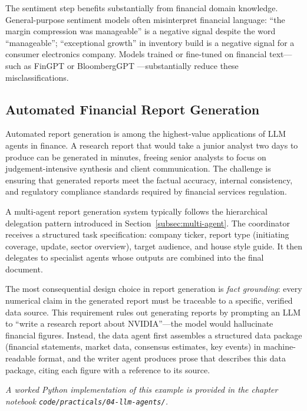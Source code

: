 \begin{context}
The sentiment step benefits substantially from financial domain knowledge. General-purpose
sentiment models often misinterpret financial language: ``the margin compression was
manageable'' is a negative signal despite the word ``manageable''; ``exceptional growth''
in inventory build is a negative signal for a consumer electronics company. Models
trained or fine-tuned on financial text---such as FinGPT \cite{Yang2023} or
BloombergGPT \cite{wu2023bloomberggpt}---substantially reduce these misclassifications.


\subsection{Automated Financial Report Generation}
\label{subsec:report-generation}

Automated report generation is among the highest-value applications of LLM agents in
finance. A research report that would take a junior analyst two days to produce can be
generated in minutes, freeing senior analysts to focus on judgement-intensive synthesis
and client communication. The challenge is ensuring that generated reports meet the
factual accuracy, internal consistency, and regulatory compliance standards required
by financial services regulation.

A multi-agent report generation system typically follows the hierarchical delegation
pattern introduced in Section~\ref{subsec:multi-agent}. The coordinator receives a
structured task specification: company ticker, report type (initiating coverage, update,
sector overview), target audience, and house style guide. It then delegates to specialist
agents whose outputs are combined into the final document.

The most consequential design choice in report generation is \emph{fact grounding}:
every numerical claim in the generated report must be traceable to a specific, verified
data source. This requirement rules out generating reports by prompting an LLM to
``write a research report about NVIDIA''---the model would hallucinate financial figures.
Instead, the data agent first assembles a structured data package (financial statements,
market data, consensus estimates, key events) in machine-readable format, and the writer
agent produces prose that describes this data package, citing each figure with a
reference to its source.

\textit{A worked Python implementation of this example is provided in the chapter notebook \texttt{code/practicals/04-llm-agents/}.}


\end{context}
